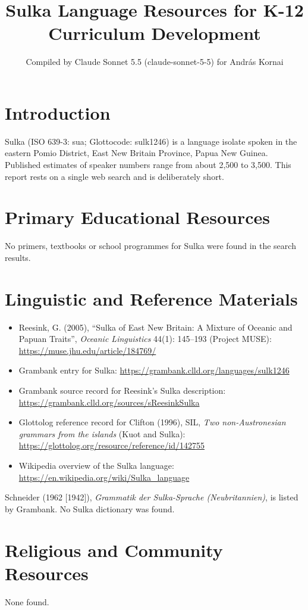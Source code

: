 \documentclass[12pt]{article}
\title{Sulka Language Resources for K-12 Curriculum Development}
\author{Compiled by Claude Sonnet 5.5 (claude-sonnet-5-5) for Andr\'as Kornai}
\date{}
\begin{document}
\maketitle

\section{Introduction}
Sulka (ISO 639-3: sua; Glottocode: sulk1246) is a language isolate spoken in the eastern Pomio District, East New Britain Province, Papua New Guinea. Published estimates of speaker numbers range from about 2,500 to 3,500. This report rests on a single web search and is deliberately short.

\section{Primary Educational Resources}
No primers, textbooks or school programmes for Sulka were found in the search results.

\section{Linguistic and Reference Materials}
\begin{itemize}
\item Reesink, G. (2005), ``Sulka of East New Britain: A Mixture of Oceanic and Papuan Traits'', \emph{Oceanic Linguistics} 44(1): 145--193 (Project MUSE): \url{https://muse.jhu.edu/article/184769/}
\item Grambank entry for Sulka: \url{https://grambank.clld.org/languages/sulk1246}
\item Grambank source record for Reesink's Sulka description: \url{https://grambank.clld.org/sources/sReesinkSulka}
\item Glottolog reference record for Clifton (1996), SIL, \emph{Two non-Austronesian grammars from the islands} (Kuot and Sulka): \url{https://glottolog.org/resource/reference/id/142755}
\item Wikipedia overview of the Sulka language: \url{https://en.wikipedia.org/wiki/Sulka_language}
\end{itemize}
Schneider (1962 [1942]), \emph{Grammatik der Sulka-Sprache (Neubritannien)}, is listed by Grambank. No Sulka dictionary was found.

\section{Religious and Community Resources}
None found.
\end{document}
